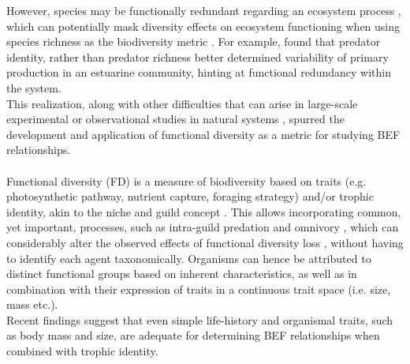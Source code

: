 %
However, species may be functionally redundant regarding an ecosystem process \citep{Hooper2002}, which can potentially mask diversity effects on ecosystem functioning when using species richness as the biodiversity metric \citep{Mora2014}.
 For example, \cite{OConnor2008} found that predator identity, rather than predator richness better determined variability of primary production in an estuarine community, hinting at functional redundancy within the system.\\ 
 This realization, along with other difficulties that can arise in large-scale experimental or observational studies in natural systems \citep[e.g. misidentification or low encounter probabilities during sampling;][]{Martinez1999}, spurred the development and application of functional diversity as a metric for studying BEF relationships.\\\\
 Functional diversity (FD) is a measure of biodiversity based on traits (e.g. photosynthetic pathway, nutrient capture, foraging strategy) and/or trophic identity, akin to the niche and guild concept \citep{Hooper2002}.  
This allows incorporating common, yet important, processes, such as intra-guild predation and omnivory \citep{Holt1997}, which can considerably alter the observed effects of functional diversity loss \citep{Ives2005}, without having to identify each agent taxonomically. Organisms can hence be attributed to distinct functional groups based on inherent characteristics, as well as in combination with their expression of traits in a continuous trait space (i.e. size, mass etc.).\\
Recent findings \citep{Loeuille2005,Berlow2009,Wood2010,Saguin2014} suggest that even simple life-history and organismal traits, such as body mass and size, are adequate for determining BEF relationships when combined with trophic identity. 
%
\\\\
